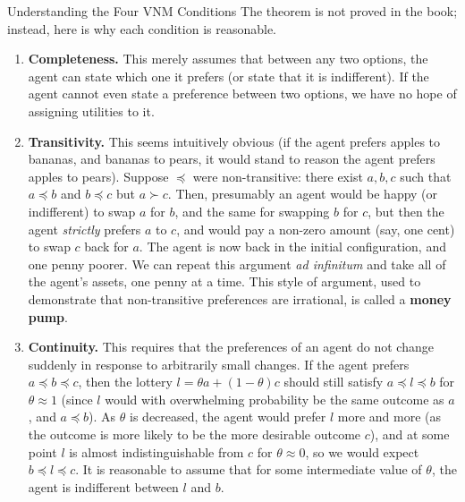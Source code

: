 \documentclass[aspectratio=169,10pt]{beamer}
\begin{document}
\begin{frame}[allowframebreaks]{Understanding the Four VNM Conditions}
  The theorem is not proved in the book; instead, here is why each
  condition is reasonable.

  \begin{enumerate}
    \item \textbf{Completeness.} This merely assumes that between any two
      options, the agent can state which one it prefers (or state that it
      is indifferent). If the agent cannot even state a preference between
      two options, we have no hope of assigning utilities to it.

    \item \textbf{Transitivity.} This seems intuitively obvious (if the
      agent prefers apples to bananas, and bananas to pears, it would
      stand to reason the agent prefers apples to pears). Suppose $\preceq$
      were non-transitive: there exist $a,b,c$ such that $a\preceq b$ and
      $b\preceq c$ but $a\succ c$. Then, presumably an agent would be happy
      (or indifferent) to swap $a$ for $b$, and the same for swapping $b$
      for $c$, but then the agent \emph{strictly} prefers $a$ to $c$, and
      would pay a non-zero amount (say, one cent) to swap $c$ back for
      $a$. The agent is now back in the initial configuration, and one
      penny poorer. We can repeat this argument \emph{ad infinitum} and
      take all of the agent's assets, one penny at a time. This style of
      argument, used to demonstrate that non-transitive preferences are
      irrational, is called a \textbf{money pump}.

      \framebreak

    \item \textbf{Continuity.} This requires that the preferences of an
      agent do not change suddenly in response to arbitrarily small
      changes. If the agent prefers $a\preceq b\preceq c$, then the
      lottery $l=\theta a+(1-\theta)c$ should still satisfy $a\preceq l
      \preceq b$ for $\theta\approx1$ (since $l$ would with overwhelming
      probability be the same outcome as $a$, and $a\preceq b$). As
      $\theta$ is decreased, the agent would prefer $l$ more and more (as
      the outcome is more likely to be the more desirable outcome $c$),
      and at some point $l$ is almost indistinguishable from $c$ for
      $\theta\approx0$, so we would expect $b\preceq l\preceq c$. It is
      reasonable to assume that for some intermediate value of $\theta$,
      the agent is indifferent between $l$ and $b$.


\end{enumerate}
\end{frame}
\end{document}
